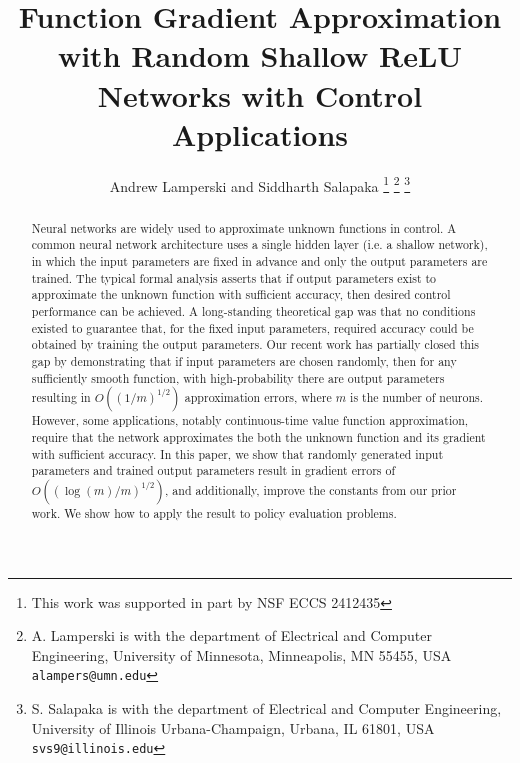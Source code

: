 \documentclass[letterpaper, 10 pt, conference]{ieeeconf}  %
\begin{document}
\title{\LARGE \bf
  Function Gradient 
  Approximation with Random Shallow ReLU Networks with Control Applications
}


\author{
Andrew Lamperski and 
  Siddharth Salapaka 
  \thanks{This work was supported in part by NSF ECCS 2412435}%
  \thanks{A. Lamperski is with the department of Electrical and Computer Engineering, University  of Minnesota, Minneapolis, MN 55455, USA {\tt\small alampers@umn.edu}}
  \thanks{S. Salapaka is  with the department of Electrical and Computer Engineering, University of Illinois Urbana-Champaign, Urbana, IL 61801, USA {\tt\small svs9@illinois.edu}}
}



\maketitle
\thispagestyle{empty}
\pagestyle{empty}

\begin{abstract}
  Neural networks are widely used to approximate unknown functions in control. 
  A common neural network architecture uses a single hidden layer (i.e. a shallow network), in which the input parameters are fixed in advance and only the output parameters are trained.
  The typical formal analysis asserts that if output parameters exist to approximate the unknown function with sufficient accuracy, then desired control performance can be achieved.
  A long-standing theoretical gap was that no conditions existed to guarantee that, for the fixed input parameters,  required accuracy could be obtained by training the output parameters.
  Our recent work has partially closed  this gap by demonstrating that if input parameters are chosen randomly, then for any sufficiently smooth function, with high-probability there are output parameters resulting in $O((1/m)^{1/2})$ 
   approximation errors, where $m$ is the number of neurons. 
  However, some applications, notably continuous-time value function approximation, require that the network approximates the both the
  unknown function and its gradient with sufficient accuracy. 
  In this paper, we show that randomly generated input parameters and trained output parameters result in gradient errors of $O\left((\log(m)/m)^{1/2}\right)$, and additionally, improve the constants from our prior work.
  We show how to apply the result to policy evaluation problems. 
\end{abstract}
\end{document}
